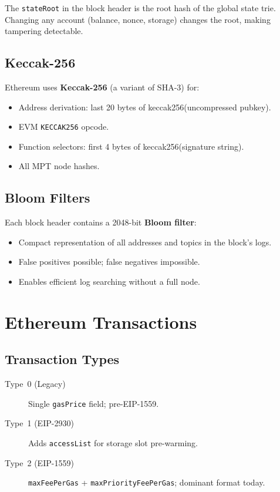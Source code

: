 \documentclass[12pt,a4paper,openany]{book}
\theoremstyle{definition}
\theoremstyle{plain}
\theoremstyle{remark}
\begin{document}
\begin{keyinsight}
  The \texttt{stateRoot} in the block header is the root hash of the
  global state trie.  Changing any account (balance, nonce, storage)
  changes the root, making tampering detectable.
\end{keyinsight}

\section{Keccak-256}

Ethereum uses \textbf{Keccak-256} (a variant of SHA-3) for:
\begin{itemize}
  \item Address derivation: last 20 bytes of keccak256(uncompressed pubkey).
  \item EVM \texttt{KECCAK256} opcode.
  \item Function selectors: first 4 bytes of keccak256(signature string).
  \item All MPT node hashes.
\end{itemize}

\section{Bloom Filters}

Each block header contains a 2048-bit \textbf{Bloom filter}:
\begin{itemize}
  \item Compact representation of all addresses and topics in the block's logs.
  \item False positives possible; false negatives impossible.
  \item Enables efficient log searching without a full node.
\end{itemize}


\chapter{Ethereum Transactions}
\label{chap:ethtx}

\section{Transaction Types}

\begin{description}
  \item[Type~0 (Legacy)] Single \texttt{gasPrice} field; pre-EIP-1559.
  \item[Type~1 (EIP-2930)] Adds \texttt{accessList} for storage slot pre-warming.
  \item[Type~2 (EIP-1559)] \texttt{maxFeePerGas} + \texttt{maxPriorityFeePerGas};
        dominant format today.
\end{description}
\end{document}
